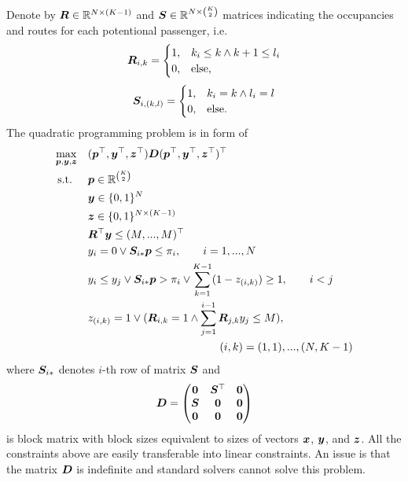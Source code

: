 Denote by $\bm{R} \in \mathbb{R}^{N \times (K-1)}$ and $\bm{S} \in \mathbb{R}^{N \times \binom{K}{2}}$ matrices indicating the occupancies and routes for each potentional passenger, i.e.
\[
	\bm{R}_{i,k} = \begin{cases}
		1, & k_i \leq k \wedge k+1 \leq l_i \\
		0, & \text{else,}
	\end{cases}
\]
\[
	\bm{S}_{i,(k,l)} = \begin{cases}
		1, & k_i = k \wedge l_i = l \\
		0, & \text{else.}
	\end{cases}
\]
The quadratic programming problem is in form of
\begin{equation*}
	\begin{aligned}
		& \underset{\bm{p}, \bm{y}, \bm{z}}{\max} & & (\bm{p}^\top, \bm{y}^\top, \bm{z}^\top) \bm{D}
				( \bm{p}^\top, \bm{y}^\top, \bm{z}^{\top} )^{\top} \\
		& \operatorname{\textrm{s.t.}} & & \bm{p} \in \mathbb{R}^{\binom{K}{2}} \\
		&     & & \bm{y} \in \{0,1\}^N \\
		&     & & \bm{z} \in \{0,1\}^{N \times (K-1)} \\
		&     & & \bm{R}^\top \bm{y} \leq (M, ..., M)^\top \\
		&     & & y_i = 0 \vee \bm{S}_{i *} \bm{p} \leq \pi_i, \qquad i = 1, ..., N \\
		&     & & y_i \leq y_j \vee \bm{S}_{i *} \bm{p} > \pi_i \vee \sum_{k=1}^{K-1} (1-z_{(i,k)}) \geq 1, \qquad i < j \\
		&     & & z_{(i,k)} = 1 \vee (\bm{R}_{i,k} = 1 \wedge \sum_{j=1}^{i-1} \bm{R}_{j,k} y_j \leq M), \\
		&     & &  \qquad \qquad \qquad \qquad \qquad \qquad (i,k) = (1,1), ..., (N,K-1) \\
	\end{aligned}
\end{equation*}
where $\bm{S}_{i *}$ denotes $i$-th row of matrix $\bm{S}$ and
\[
	\bm{D} = \begin{pmatrix}
		\bm{0} & \bm{S}^\top & \bm{0} \\
		\bm{S} & \bm{0}     & \bm{0} \\
		\bm{0} & \bm{0}     & \bm{0}
	\end{pmatrix}
\]
is block matrix with block sizes equivalent to sizes of vectors $\bm{x}$, $\bm{y}$, and $\bm{z}$.
All the constraints above are easily transferable into linear constraints. An issue is that the matrix $\bm{D}$ is indefinite and standard solvers cannot solve this problem.



